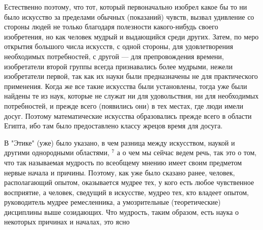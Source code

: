 \documentclass[oneside, 17pt, dvipsnames]{extbook}
\begin{document}
Естественно поэтому, что тот, который первоначально изобрел какое бы то ни было искусство за пределами обычных (показаний) чувств, вызвал удивление со стороны людей не только благодаря полезности какого-нибудь своего изобретения, но как человек мудрый и выдающийся среди других. Затем, по меро открытия большого числа искусств, с одной стороны, для удовлетворения необходимых потребностей, с другой --- для препровождения времени, изобретатели второй группы всегда признавались более мудрыми, нежели изобретатели первой, так как их науки были предназначены не для практического применения. Когда же все такие искусства были установлены, тогда уже были найдены те из наук, которые не служат ни для удовольствия, ни для необходимых потребностей, и прежде всего (появились они) в тех местах, где люди имели досуг. Поэтому математические искусства образовались прежде всего в области Египта, ибо там было предоставлено классу жрецов время для досуга.

В "Этике" (уже) было указано, в чем разница между искусством, наукой и другими однородными областями, $^7$ а о чем мы сейчас ведем речь, так это о том, что так называемая мудрость по всеобщему мнению имеет своим предметом нервые начала и причины. Поэтому, как уже было сказано ранее, человек, располагающий опытом, оказывается мудрее тех, у кого есть любое чувственное восприятие, а человек, сведущий в искусстве, мудрео тех, кто владеет опытом, руководитель мудрее ремесленника, а умозрительные (теоретические) дисциплины выше созидающих. Что мудрость, таким образом, есть наука о некоторых причинах и началах, это ясно
\end{document}
